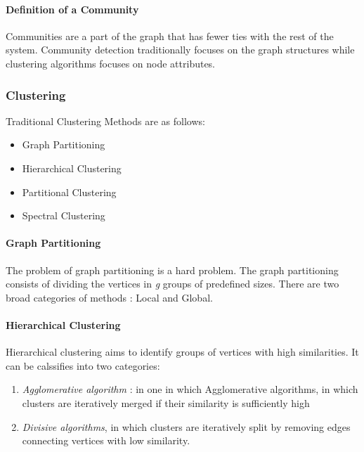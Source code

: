 \paragraph{Definition of a Community}
Communities are a part of the graph that has fewer ties with the rest of the system. Community detection traditionally focuses on the graph structures while clustering algorithms focuses on node attributes. 


\subsubsection{Clustering}

Traditional Clustering Methods are as follows:
\begin{itemize}

\item Graph Partitioning 

\item Hierarchical Clustering

\item Partitional Clustering

\item Spectral Clustering

\end{itemize}

\paragraph{Graph Partitioning}
 The problem of graph partitioning is a hard problem. The graph partitioning consists of dividing the vertices in \textit{g} groups of predefined sizes. 
 There are two broad categories of methods : Local and Global.
\paragraph{Hierarchical Clustering}
Hierarchical clustering aims to identify groups of vertices with high similarities. It can be calssifies into two categories:
 \begin{enumerate}
\item \textit{Agglomerative algorithm} : in one in which Agglomerative algorithms, in which clusters are iteratively merged if their similarity is sufficiently
high
\item \textit{Divisive algorithms}, in which clusters are iteratively
split by removing edges connecting vertices with
low similarity.
\end{enumerate} 

